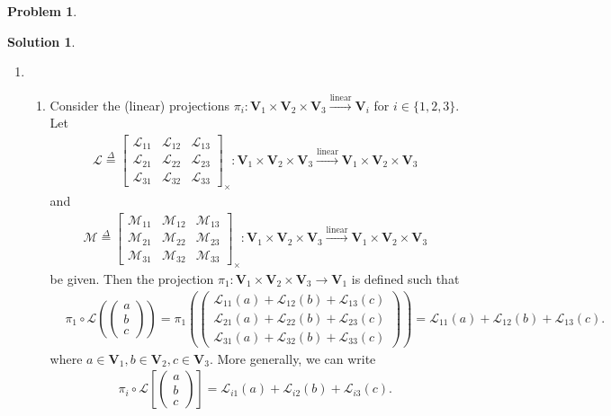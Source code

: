 \documentclass{article}
\theoremstyle{definition}
\newtheorem*{prob*}{Problem}
\newtheorem*{sln*}{Solution}
\newcommand{\V}{\mathbf{V}}
\newcommand{\lag}{\mathcal{L}}
\newcommand{\M}{\mathcal{M}}
\newcommand{\lin}{\overset{\text{linear}}{\longrightarrow}}
\begin{document}
\begin{prob*}
\begin{sln*}
\begin{enumerate}
			\item 
			\begin{enumerate}
				\item Consider the (linear) projections $\pi_i : \V_1 \times \V_2 \times \V_3 \lin \V_i$ for $i \in \{1,2,3 \}$. Let 
			\begin{align*}
			\lag \stackrel{\Delta}{=} \begin{bmatrix}
			\lag_{11} & \lag_{12} & \lag_{13}\\
			\lag_{21} & \lag_{22} & \lag_{23}\\
			\lag_{31} & \lag_{32} & \lag_{33} 
			\end{bmatrix}_\times : \V_1 \times \V_2 \times \V_3 \lin\V_1 \times \V_2 \times \V_3
			\end{align*} 
			and
			\begin{align*}
			\M \stackrel{\Delta}{=} \begin{bmatrix}
			\M_{11} & \M_{12} & \M_{13}\\
			\M_{21} & \M_{22} & \M_{23}\\
			\M_{31} & \M_{32} & \M_{33} 
			\end{bmatrix}_\times : \V_1 \times \V_2 \times \V_3 \lin\V_1 \times \V_2 \times \V_3
			\end{align*} 
			be given. Then the projection $\pi_1 : \V_1 \times \V_2 \times \V_3\to \V_1 $ is defined such that
			\begin{align*}
			&\pi_1 \circ \lag\left(\begin{pmatrix}
			a\\b\\c
			\end{pmatrix}\right) = \pi_1\left( \begin{pmatrix}
			\lag_{11}(a) + \lag_{12}(b) + \lag_{13}(c)\\
			\lag_{21}(a) + \lag_{22}(b) + \lag_{23}(c)\\
			\lag_{31}(a) + \lag_{32}(b) + \lag_{33}(c)
			\end{pmatrix} \right)
			= \lag_{11}(a) + \lag_{12}(b) + \lag_{13}(c).
			\end{align*}
			where $a \in \V_1, b\in \V_2, c\in \V_3$. More generally, we can write
			\begin{align*}
			\pi_i \circ \lag\left[ \begin{pmatrix}
			a\\b\\c
			\end{pmatrix} \right]
			=
			\lag_{i1}(a) + \lag_{i2}(b) + \lag_{i3}(c).
			\end{align*}

\end{enumerate}
\end{enumerate}
\end{sln*}
\end{prob*}
\end{document}
